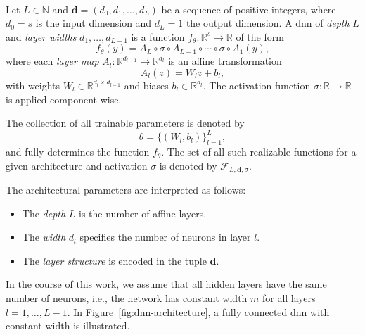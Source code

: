 \begin{definition} \ \\
Let $L \in \mathbb{N}$ and $\mathbf{d} = (d_0, d_1, \dots, d_L)$ be a sequence
of positive integers, where $d_0 = s$ is the input dimension and $d_L = 1$ the
output dimension. A \acf{dnn} of \emph{depth} $L$ and \emph{layer widths} $d_1,
\dots, d_{L-1}$ is a function $f_\theta: \mathbb{R}^s \to \mathbb{R}$ of the
form
\begin{equation*}
    f_\theta(y) = A_L \circ \sigma \circ A_{L-1} \circ \cdots \circ \sigma \circ A_1(y),
\end{equation*}
where each \emph{layer map} $A_l: \mathbb{R}^{d_{l-1}} \to \mathbb{R}^{d_l}$ is
an affine transformation
\begin{equation*}
    A_l(z) = W_l z + b_l,
\end{equation*}
with weights $W_l \in \mathbb{R}^{d_l \times d_{l-1}}$ and biases $b_l \in
\mathbb{R}^{d_l}$. The activation function $\sigma: \mathbb{R} \to \mathbb{R}$
is applied component-wise.

The collection of all trainable parameters is denoted by
\begin{equation*}
\theta = \{ (W_l, b_l) \}_{l=1}^L,
\end{equation*}
and fully determines the function $f_\theta$. The set of all such realizable
functions for a given architecture and activation $\sigma$ is denoted by
$\mathcal{F}_{L, \mathbf{d}, \sigma}$.

\vspace{0.5em}
\noindent The architectural parameters are interpreted as follows:
\begin{itemize}
    \item The \emph{depth} $L$ is the number of affine layers.
    \item The \emph{width} $d_l$ specifies the number of neurons in layer $l$.
    \item The \emph{layer structure} is encoded in the tuple $\mathbf{d}$.
\end{itemize}
\end{definition}


In the course of this work, we assume that all hidden layers have the same
number of neurons, i.e., the network has constant width $m$ for all layers $l =
1, \dots, L-1$. In Figure~\ref{fig:dnn-architecture}, a fully connected \ac{dnn}
with constant width is illustrated.

